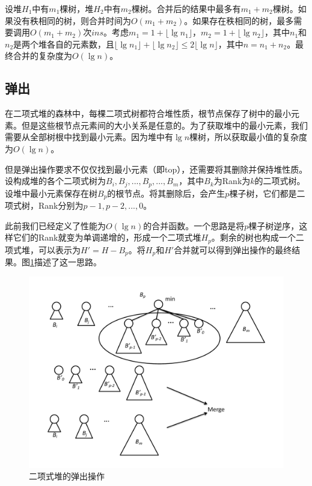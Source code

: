 \documentclass[b5paper]{ctexart}
\begin{document}
设堆$H_1$中有$m_1$棵树，堆$H_2$中有$m_2$棵树。合并后的结果中最多有$m_1 + m_2$棵树。如果没有秩相同的树，则合并时间为$O(m_1 + m_2)$。如果存在秩相同的树，最多需要调用$O(m_1 + m_2)$次$ins$。考虑$m_1 = 1 + \lfloor \lg n_1 \rfloor$，$m_2 = 1 + \lfloor \lg n_2 \rfloor$，其中$n_1$和$n_2$是两个堆各自的元素数，且$\lfloor \lg n_1 \rfloor + \lfloor \lg n_2 \rfloor \leq 2 \lfloor \lg n \rfloor$，其中$n = n_1 + n_2$。最终合并的复杂度为$O(\lg n)$。

\subsection{弹出}

在二项式堆的森林中，每棵二项式树都符合堆性质，根节点保存了树中的最小元素。但是这些根节点元素间的大小关系是任意的。为了获取堆中的最小元素，我们需要从全部树根中找到最小元素。因为堆中有$\lg n$棵树，所以获取最小值的复杂度为$O(\lg n)$。

但是弹出操作要求不仅仅找到最小元素（即top），还需要将其删除并保持堆性质。设构成堆的各个二项式树为$B_i, B_j, ..., B_p, ..., B_m$，其中$B_k$为Rank为$k$的二项式树。设堆中最小元素保存在树$B_p$的根节点。将其删除后，会产生$p$棵子树，它们都是二项式树，Rank分别为$p-1, p-2, ..., 0$。

此前我们已经定义了性能为$O(\lg n)$的合并函数。一个思路是将$p$棵子树逆序，这样它们的Rank就变为单调递增的，形成一个二项式堆$H_p$。剩余的树也构成一个二项式堆，可以表示为$H' = H - B_p$。将$H_p$和$H'$合并就可以得到弹出操作的最终结果。图\ref{fig:bheap-del-min}描述了这一思路。

\begin{figure}[htbp]
  \centering
  \includegraphics[scale=0.5]{img/bheap-pop}
  \caption{二项式堆的弹出操作}
  \label{fig:bheap-del-min}
\end{figure}
\end{document}
